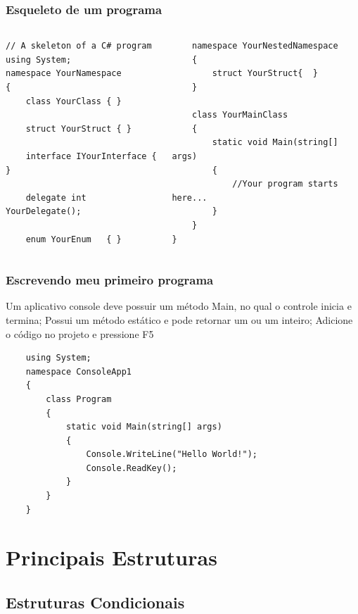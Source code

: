 \documentclass{beamer}
\begin{document}
\begin{frame}[fragile]
\frametitle{Esqueleto de um programa \CS}
\begin{columns}[T]
	\begin{column}{0.5\textwidth}
		\begin{lstlisting}		
// A skeleton of a C# program 
using System;
namespace YourNamespace
{
	class YourClass	{ }
	
	struct YourStruct {	}
	
	interface IYourInterface {	}
	
	delegate int YourDelegate();
	
	enum YourEnum 	{ }
		\end{lstlisting}
	\end{column}
	\begin{column}{0.5\textwidth}	
		\begin{lstlisting}	
	namespace YourNestedNamespace
	{
		struct YourStruct{	}
	}
	
	class YourMainClass
	{
		static void Main(string[] args) 
		{
			//Your program starts here...
		}
	}
}		
\end{lstlisting}
		
		
	\end{column}
\end{columns}
\end{frame}

\begin{frame}[fragile]
\frametitle{Escrevendo meu primeiro programa}
\begin{outline}
	\1 Um aplicativo console deve possuir um método Main, no qual o controle inicia e termina;
	\1 Possui um método estático e pode retornar um  ou um inteiro;
	\1 Adicione o código no projeto e pressione F5
	\2  \begin{lstlisting}
	using System;	
	namespace ConsoleApp1
	{
		class Program
		{
			static void Main(string[] args)
			{
				Console.WriteLine("Hello World!");
				Console.ReadKey();
			}
		}
	}
	\end{lstlisting}

\end{outline}
\end{frame}



\section{Principais Estruturas}
\subsection{Estruturas Condicionais}
\end{document}
